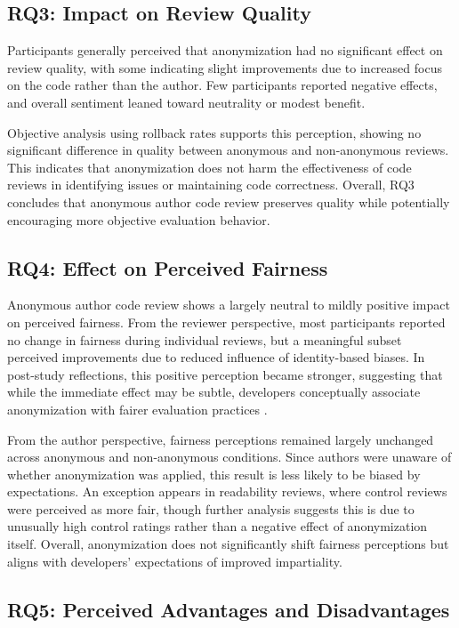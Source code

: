 \subsection{RQ3: Impact on Review Quality}

Participants generally perceived that anonymization had no significant effect on review quality, with some indicating slight improvements due to increased focus on the code rather than the author. Few participants reported negative effects, and overall sentiment leaned toward neutrality or modest benefit.

Objective analysis using rollback rates supports this perception, showing no significant difference in quality between anonymous and non-anonymous reviews. This indicates that anonymization does not harm the effectiveness of code reviews in identifying issues or maintaining code correctness. Overall, RQ3 concludes that anonymous author code review preserves quality while potentially encouraging more objective evaluation behavior.


\subsection{RQ4: Effect on Perceived Fairness}

Anonymous author code review shows a largely neutral to mildly positive impact on perceived fairness. From the reviewer perspective, most participants reported no change in fairness during individual reviews, but a meaningful subset perceived improvements due to reduced influence of identity-based biases. In post-study reflections, this positive perception became stronger, suggesting that while the immediate effect may be subtle, developers conceptually associate anonymization with fairer evaluation practices .

From the author perspective, fairness perceptions remained largely unchanged across anonymous and non-anonymous conditions. Since authors were unaware of whether anonymization was applied, this result is less likely to be biased by expectations. An exception appears in readability reviews, where control reviews were perceived as more fair, though further analysis suggests this is due to unusually high control ratings rather than a negative effect of anonymization itself. Overall, anonymization does not significantly shift fairness perceptions but aligns with developers’ expectations of improved impartiality.

\subsection{RQ5: Perceived Advantages and Disadvantages}

